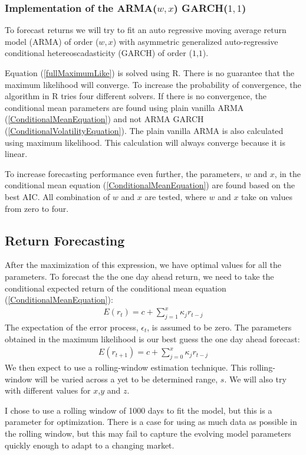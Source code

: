 \subsubsection*{Implementation of the ARMA($w,x$) GARCH($1,1$)}
To forecast returns we will try to fit an auto regressive moving average return model (ARMA) of order ($w,x$) with asymmetric generalized auto-regressive conditional hetereoscadasticity (GARCH) of order ($1$,$1$).

Equation (\ref{fullMaximumLike}) is solved using R. There is no guarantee that the maximum likelihood will converge. To increase the probability of convergence, the algorithm in R tries four different solvers. If there is no convergence, the conditional mean parameters are found using plain vanilla ARMA (\ref{ConditionalMeanEquation}) and not ARMA GARCH (\ref{ConditionalVolatilityEquation}). The plain vanilla ARMA is also calculated using maximum likelihood. This calculation will always converge because it is linear. 

To increase forecasting performance even further, the parameters, $w$ and $x$, in the conditional mean equation (\ref{ConditionalMeanEquation}) are found based on the best AIC. All combination of $w$ and $x$ are tested, where $w$ and $x$ take on values from zero to four.
\subsection*{Return Forecasting}

After the maximization of this expression, we have optimal values for all the parameters. To forecast the the one day ahead return, we need to take the conditional expected return of the conditional mean equation (\ref{ConditionalMeanEquation}):
\begin{align} 
    E(r_{t})=c+\sum_{j=1}^x\kappa_j r_{t-j}
\end{align}
The expectation of the error process, $\epsilon_t$, is assumed to be zero. The parameters obtained in the maximum likelihood is our best guess the one day ahead forecast:
\begin{align} 
    E(r_{t+1})=c+\sum_{j=0}^x\kappa_j r_{t-j}
\end{align}
We then expect to use a rolling-window estimation technique. This rolling-window will be varied across a yet to be determined range, $s$. We will also try with different values for $x$,$y$ and $z$. 

I chose to use a rolling window of 1000 days to fit the model, but this is a parameter for optimization. There is a case for using as much data as possible in the rolling window, but this may fail to capture the evolving model parameters quickly enough to adapt to a changing market.

